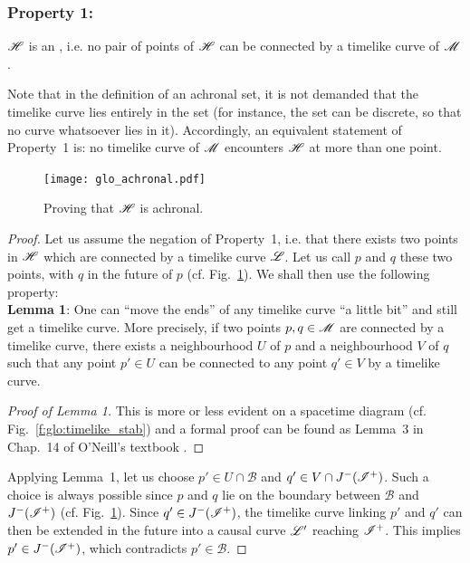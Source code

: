 \subsubsection{Property 1:}
\begin{greybox}
$\mathscr{H}$ is an , i.e. no pair of points of $\mathscr{H}$ can be connected
by a timelike curve of $\mathscr{M}$.
\end{greybox}

Note that in the definition of an achronal set, it is not demanded that the timelike
curve lies entirely in the set (for instance, the set can be discrete, so that no curve
whatsoever lies in it). Accordingly,
an equivalent statement of Property~1 is: no timelike curve of $\mathscr{M}$
encounters $\mathscr{H}$ at more than one point.

\begin{figure}
\centerline{\texttt{[image: glo\_achronal.pdf]}}
\caption[]{\label{f:glo:achronal} \footnotesize
Proving that $\mathscr{H}$ is achronal.}
\end{figure}

\begin{proof}
Let us assume the negation of Property~1, i.e. that there exists two points
in $\mathscr{H}$ which are connected by a timelike curve $\mathscr{L}$. Let us call $p$ and
$q$ these two points, with $q$ in the future of $p$ (cf. Fig.~\ref{f:glo:achronal}).
We shall then use the following property:\\[1ex]
\textbf{Lemma 1}: One can ``move the ends'' of any timelike curve
``a little bit'' and still get a timelike curve. More precisely,
if two points $p,q\in\mathscr{M}$ are connected by a timelike curve,
there exists
a neighbourhood $U$ of $p$ and a neighbourhood $V$ of $q$ such that
any point $p'\in U$ can be connected to any point $q'\in V$ by a timelike curve.
\begin{proof}[Proof of Lemma 1]
This is more or less evident on a spacetime diagram (cf. Fig.~\ref{f:glo:timelike_stab})
and a formal proof
can be found as Lemma~3
in Chap.~14 of O'Neill's textbook \cite{ONeil83}.
\end{proof}
Applying Lemma~1,
let us choose $p'\in U\cap\mathscr{B}$ and $q'\in V\cap J^-(\mathscr{I}^+)$. Such a choice is
always possible since $p$ and $q$ lie on the boundary between $\mathscr{B}$
and $J^-(\mathscr{I}^+)$ (cf. Fig.~\ref{f:glo:achronal}).
Since $q'\in J^-(\mathscr{I}^+)$, the timelike curve linking $p'$ and $q'$ can then be extended in the future into a causal curve $\mathscr{L}'$ reaching $\mathscr{I}^+$. This implies $p'\in J^-(\mathscr{I}^+)$,
which contradicts $p'\in\mathscr{B}$.
\end{proof}

